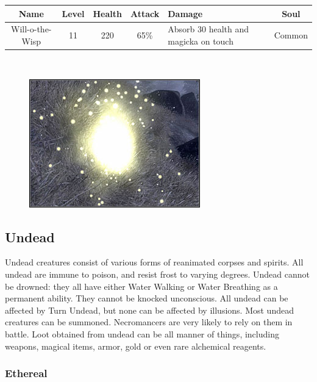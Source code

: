\documentclass[12pt]{book}
\begin{document}
\begin{tabular}{|c|c|c|c|p{}|c|}
\hline
Name & Level & Health & Attack & Damage & Soul\\ \hline
Will-o-the-Wisp & 11 & 220 & 65\% & Absorb 30 health and magicka on touch & Common\\ \hline
\end{tabular}\\

\begin{figure}[h]
	\centering
	\includegraphics[scale=1]{willothewisp.png}
\end{figure}

\subsection{Undead}
Undead creatures consist of various forms of reanimated corpses and spirits. All undead are immune to poison, and resist frost to varying degrees. Undead cannot be drowned: they all have either Water Walking or Water Breathing as a permanent ability. They cannot be knocked unconscious. All undead can be affected by Turn Undead, but none can be affected by illusions. Most undead creatures can be summoned. Necromancers are very likely to rely on them in battle. Loot obtained from undead can be all manner of things, including weapons, magical items, armor, gold or even rare alchemical reagents.

\subsubsection{Ethereal}
\end{document}
